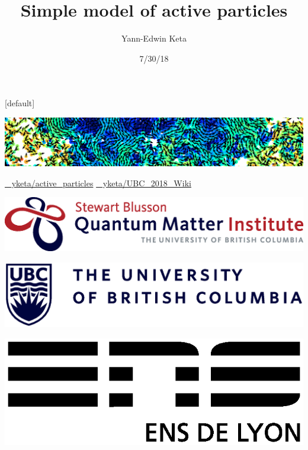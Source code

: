 \documentclass{beamer}
\title{Simple model of active particles}
\author{Yann-Edwin Keta}
\date{7/30/18}
\begin{document}
{
\makeatletter
    [default]
    \def\beamer@entrycode{\vspace*{-\headheight}}
\begin{frame}

\vspace*{-4mm}
{
 \hspace*{-\beamerleftmargin}%
\begin{minipage}{\paperwidth}
\includegraphics[width=\paperwidth]{header.png}
\end{minipage}
}

\titlepage

\begin{center}
\begin{minipage}{0.8\linewidth}
\href{https://github.com/yketa/active_particles}{{\footnotesize \faGithub~ yketa/active\_particles}}
\hfill\href{https://github.com/yketa/UBC_2018_Wiki}{{\footnotesize \faGithub~ yketa/UBC\_2018\_Wiki}}
\end{minipage}
\end{center}

\begin{minipage}{0.35\linewidth}
\includegraphics[scale=0.18]{logoqmi.eps}\hfill
\end{minipage}
\hfill
\begin{minipage}{0.36\linewidth}
\includegraphics[scale=0.14]{logoubc.eps}
\end{minipage}
\hfill
\begin{minipage}{0.19\linewidth}
\hfill\includegraphics[scale=0.22]{logoens.eps}
\end{minipage}

\end{frame}
}
\end{document}
